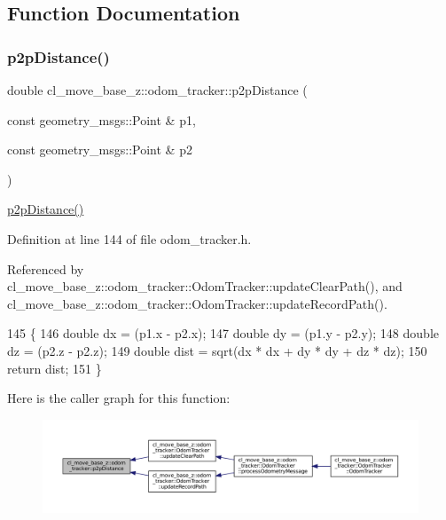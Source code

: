 \subsection{Function Documentation}
\mbox{\label{namespacecl__move__base__z_1_1odom__tracker_a501582a760a02ce0069d95bfc67ca973}} 
\subsubsection{\texorpdfstring{p2p\+Distance()}{p2pDistance()}}
{\footnotesize\ttfamily double cl\+\_\+move\+\_\+base\+\_\+z\+::odom\+\_\+tracker\+::p2p\+Distance (\begin{DoxyParamCaption}\item[{const geometry\+\_\+msgs\+::\+Point \&}]{p1,  }\item[{const geometry\+\_\+msgs\+::\+Point \&}]{p2 }\end{DoxyParamCaption})\hspace{0.3cm}{\ttfamily [inline]}}

\hyperlink{namespacecl__move__base__z_1_1odom__tracker_a501582a760a02ce0069d95bfc67ca973}{p2p\+Distance()} 

Definition at line 144 of file odom\+\_\+tracker.\+h.



Referenced by cl\+\_\+move\+\_\+base\+\_\+z\+::odom\+\_\+tracker\+::\+Odom\+Tracker\+::update\+Clear\+Path(), and cl\+\_\+move\+\_\+base\+\_\+z\+::odom\+\_\+tracker\+::\+Odom\+Tracker\+::update\+Record\+Path().


\begin{DoxyCode}
145 \{
146     \textcolor{keywordtype}{double} dx = (p1.x - p2.x);
147     \textcolor{keywordtype}{double} dy = (p1.y - p2.y);
148     \textcolor{keywordtype}{double} dz = (p2.z - p2.z);
149     \textcolor{keywordtype}{double} dist = sqrt(dx * dx + dy * dy + dz * dz);
150     \textcolor{keywordflow}{return} dist;
151 \}
\end{DoxyCode}
Here is the caller graph for this function\+:
\nopagebreak
\begin{figure}[H]
\begin{center}
\leavevmode
\includegraphics[width=350pt]{namespacecl__move__base__z_1_1odom__tracker_a501582a760a02ce0069d95bfc67ca973_icgraph}
\end{center}
\end{figure}
